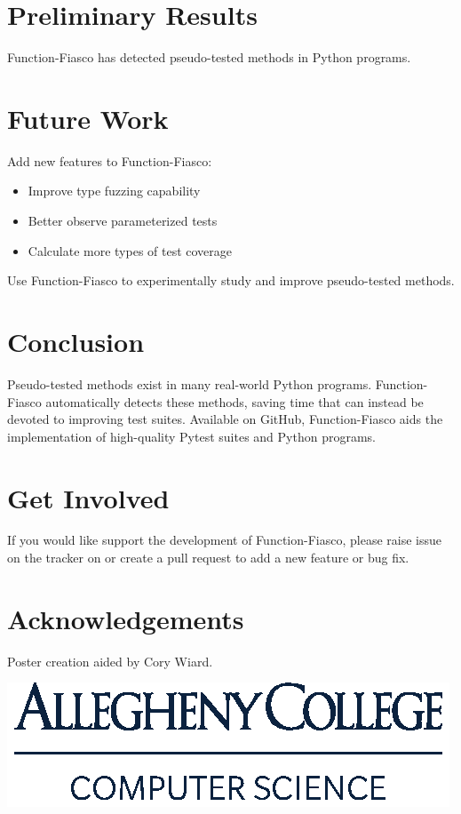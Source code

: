 \documentclass[a0paper,fleqn]{betterposter}
\begin{document}
{  }{


  \section{Preliminary Results}

  

  Function-Fiasco has detected pseudo-tested methods in Python programs.

  \section{Future Work}
  Add new features to Function-Fiasco: \\
  \vspace*{-.5in}

  \begin{itemize}[leftmargin=*]

    \item{Improve type fuzzing capability}
    \item{Better observe parameterized tests}
    \item{Calculate more types of test coverage}

  \end{itemize}

  \vspace{1em}
  Use Function-Fiasco to experimentally study and improve pseudo-tested methods.

  \section{Conclusion}
  Pseudo-tested methods exist in many real-world Python programs.
  Function-Fiasco automatically detects these methods, saving time that can
  instead be devoted to improving test suites.
  Available on GitHub, Function-Fiasco aids the implementation of high-quality
  Pytest suites and Python programs.

  \section{Get Involved}
  If you would like support the development of Function-Fiasco, please raise issue
  on the tracker on or create a pull request to add a new feature or bug fix.
  \vfill

  \section{Acknowledgements}
  Poster creation aided by Cory Wiard.\\

  \vspace*{.5in}

  \includegraphics[width=\textwidth]{img/ComputerScience-Stack}

}
\end{document}
